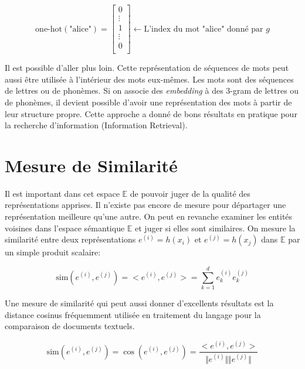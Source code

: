 \begin{equation}
\label{eq:onehot}
\textrm{one-hot}(\textrm{"alice"}) =
\begin{bmatrix}
0\\
\vdots\\
1\\
\vdots\\
0\\
\end{bmatrix} 
\leftarrow \textrm{L'index du mot "alice" donné par $g$}
\end{equation}


Il est possible d'aller plus loin. Cette représentation de séquences de mots
peut aussi être utilisée à l'intérieur des mots eux-mêmes. Les mots sont des
séquences de lettres ou de phonèmes. Si on associe des {\it embedding} à des
3-gram de lettres ou de phonèmes, il devient possible d'avoir une
représentation des mots à partir de leur structure propre.  Cette approche
\citep{rnn58} a donné de bons résultats en pratique pour la recherche
d'information (Information Retrieval).

\section{Mesure de Similarité}

Il est important dans cet espace $\mathbb{E}$ de pouvoir juger de la qualité des
représentations apprises. Il n'existe pas encore de mesure pour départager une
représentation meilleure qu'une autre. On peut en revanche examiner les entités
voisines dans l'espace sémantique $\mathbb{E}$ et juger si elles sont
similaires. On mesure la similarité entre deux représentations $e^{(i)}=h(x_i)$ et
$e^{(j)}=h(x_j)$ dans $\mathbb{E}$ par un simple produit scalaire:

\begin{equation}
\label{eq:dot-simple}
\textrm{sim}(e^{(i)}, e^{(j)})=<e^{(i)}, e^{(j)}> = \sum_{k=1}^{d}e^{(i)}_k e^{(j)}_k
\end{equation}

Une mesure de similarité qui peut aussi donner d'excellents résultats est la
distance cosinus fréquemment utilisée en traitement du langage pour la
comparaison de documents textuels.  

\begin{equation}
\textrm{sim}(e^{(i)}, e^{(j)})=\cos (e^{(i)}, e^{(j)}) = \dfrac{ <e^{(i)}, e^{(j)}> }{\Vert e^{(i)}\Vert \Vert e^{(j)}\Vert}
\end{equation}

